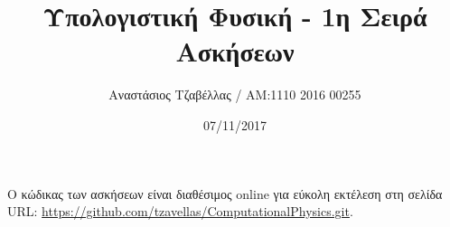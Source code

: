 \documentclass[11pt]{article}
\begin{document}
\title{Υπολογιστική Φυσική - 1η Σειρά Ασκήσεων}
\author{Αναστάσιος Τζαβέλλας / ΑΜ:1110 2016 00255}
\date{07/11/2017}
\maketitle







Ο κώδικας των ασκήσεων είναι διαθέσιμος \textlatin{online} για εύκολη εκτέλεση στη σελίδα  URL: \url{https://github.com/tzavellas/ComputationalPhysics.git}.
\end{document}
